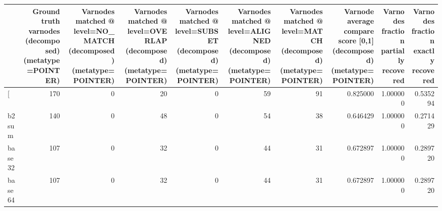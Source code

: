 \begin{tabular}{lrrrrrrrrr}
\toprule
{} &  Ground truth varnodes (decomposed) (metatype=POINTER) &  Varnodes matched @ level=NO\_MATCH (decomposed) (metatype=POINTER) &  Varnodes matched @ level=OVERLAP (decomposed) (metatype=POINTER) &  Varnodes matched @ level=SUBSET (decomposed) (metatype=POINTER) &  Varnodes matched @ level=ALIGNED (decomposed) (metatype=POINTER) &  Varnodes matched @ level=MATCH (decomposed) (metatype=POINTER) &  Varnode average compare score [0,1] (decomposed) (metatype=POINTER) &  Varnodes fraction partially recovered &  Varnodes fraction exactly recovered \\
\midrule
[         &                                                170 &                                                  0 &                                                 20 &                                                  0 &                                                 59 &                                                 91 &                                           0.825000 &                               1.000000 &                             0.535294 \\
b2sum     &                                                140 &                                                  0 &                                                 48 &                                                  0 &                                                 54 &                                                 38 &                                           0.646429 &                               1.000000 &                             0.271429 \\
base32    &                                                107 &                                                  0 &                                                 32 &                                                  0 &                                                 44 &                                                 31 &                                           0.672897 &                               1.000000 &                             0.289720 \\
base64    &                                                107 &                                                  0 &                                                 32 &                                                  0 &                                                 44 &                                                 31 &                                           0.672897 &                               1.000000 &                             0.289720 \\

\end{tabular}
